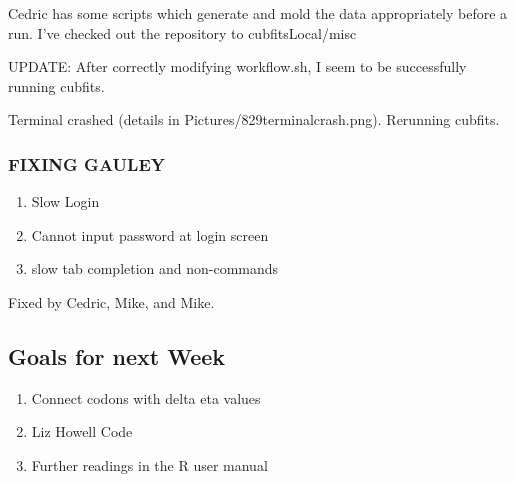 \documentclass[11pt]{article} %
\begin{document}
Cedric has some scripts which generate and mold the data appropriately before a run. I've checked out the repository to cubfitsLocal/misc

UPDATE:
After correctly modifying workflow.sh, I seem to be successfully running cubfits.

Terminal crashed (details in Pictures/829terminalcrash.png). Rerunning cubfits. 


\subsubsection{FIXING GAULEY}
\begin{enumerate}
\item Slow Login
\item Cannot input password at login screen
\item slow tab completion and non-commands
\end{enumerate}

Fixed by Cedric, Mike, and Mike.

\subsection{Goals for next Week}
\begin{enumerate}
\item Connect codons with delta eta values
\item Liz Howell Code
\item Further readings in the R user manual
\end{enumerate}
\end{document}
